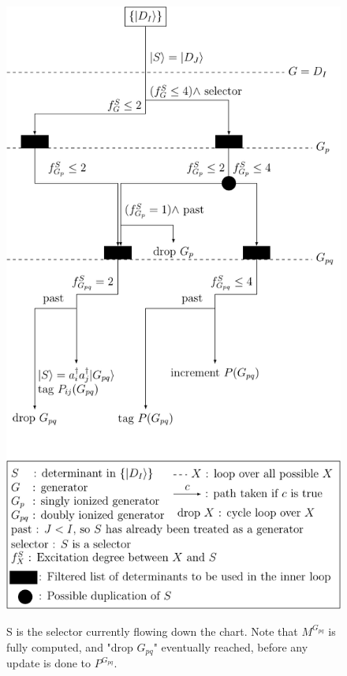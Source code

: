 \documentclass[./thesis.tex]{subfiles}
\begin{document}
\begin{figure}[h!]
	\begin{center}
		\includegraphics[width=1.00\columnwidth]{figures/cipsi/selection}
		\caption{\label{fig:selection}}
		S is the selector currently flowing down the chart.
		Note that $M^{G_{pq}}$ is fully computed, and "drop $G_{pq}$" eventually reached, before any update is done to $P^{G_{pq}}$.
		
	\end{center}
\end{figure}
\end{document}
